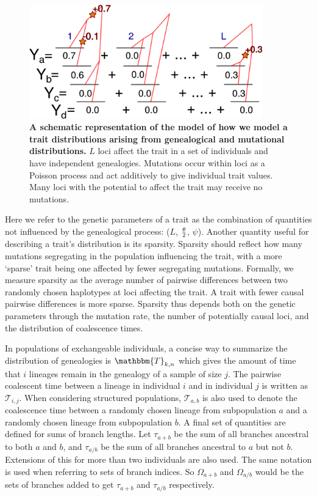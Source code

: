 \begin{figure}
  \centering
  \includegraphics[width=0.9\textwidth]{./figures/schema.png}

  \caption{\textbf{A schematic representation of the model of how we model a
  trait distributions arising from genealogical and mutational distributions.}
  $L$ loci affect the trait in a set of individuals and have independent
  genealogies. Mutations occur within loci as a Poisson process and act
  additively to give individual trait values. Many loci with the potential to
  affect the trait may receive no mutations.}

  \label{fig:schema}
\end{figure}

Here we refer to the genetic parameters of a trait as the combination of
quantities not influenced by the genealogical process: ($L$, $\frac{\theta}{2}$, $\psi$).
Another quantity useful for describing a trait's distribution is its sparsity.
Sparsity should reflect how many mutations segregating in the population
influencing the trait, with a more `sparse' trait being one affected by fewer
segregating mutations. Formally, we measure sparsity as the average number of
pairwise differences between two randomly chosen haplotypes at loci affecting
the trait. A trait with fewer causal pairwise differences is more sparse.
Sparsity thus depends both on the genetic parameters through the mutation rate,
the number of potentially causal loci, and the distribution of coalescence
times.

In populations of exchangeable individuals, a concise way to summarize the
distribution of genealogies is $\mathbbm{T}_{k,n}$ which gives the amount of
time that $i$ lineages remain in the genealogy of a sample of size $j$. The
pairwise coalescent time between a lineage in individual $i$ and in individual
$j$ is written as $\mathcal{T}_{i,j}$. When considering structured populations,
$\mathcal{T}_{a,b}$ is also used to denote the coalescence time between a
randomly chosen lineage from subpopulation $a$ and a randomly chosen lineage
from subpopulation $b$. A final set of quantities are defined for sums of branch
lengths. Let $\tau_{a+b}$ be the sum of all branches ancestral to both $a$ and
$b$, and $\tau_{a/b}$ be the sum of all branches ancestral to $a$ but not $b$.
Extensions of this for more than two individuals are also used. The same
notation is used when referring to sets of branch indices. So $\Omega_{a+b}$ and
$\Omega_{a/b}$ would be the sets of branches added to get $\tau_{a+b}$ and
$\tau_{a/b}$ respectively.

